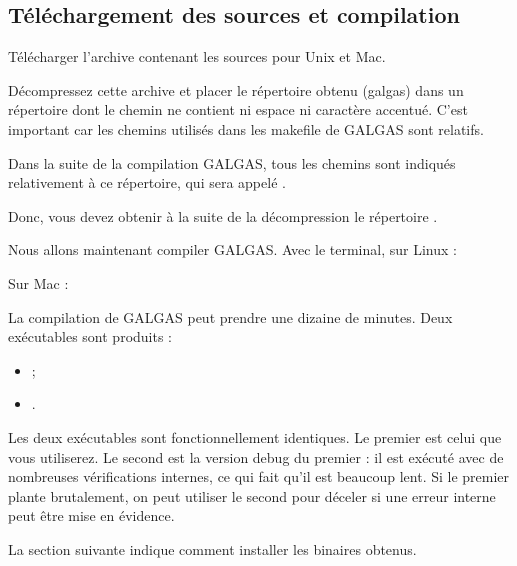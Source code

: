 \subsection{Téléchargement des sources et compilation}

Télécharger l’archive contenant les sources pour Unix et Mac.

Décompressez cette archive et placer le répertoire obtenu (galgas) dans un répertoire dont le chemin ne contient ni espace ni caractère accentué. C'est important car les chemins utilisés dans les makefile de GALGAS sont relatifs.

Dans la suite de la compilation GALGAS, tous les chemins sont indiqués relativement à ce répertoire, qui sera appelé .

Donc, vous devez obtenir à la suite de la décompression le répertoire .

Nous allons maintenant compiler GALGAS. Avec le terminal, sur Linux :
\begin{description}
  \item[ ] 
  \item[ ] 
\end{description}

Sur Mac :
\begin{description}
  \item[ ] 
  \item[ ] 
\end{description}

La compilation de GALGAS peut prendre une dizaine de minutes. Deux exécutables sont produits :

\begin{itemize}
  \item {} ;
  \item {}.
\end{itemize}

Les deux exécutables sont fonctionnellement identiques. Le premier est celui que vous utiliserez. Le second est la version debug du premier : il est exécuté avec de nombreuses vérifications internes, ce qui fait qu’il est beaucoup lent. Si le premier plante brutalement, on peut utiliser le second pour déceler si une erreur interne peut être mise en évidence.

La section suivante indique comment installer les binaires obtenus.

